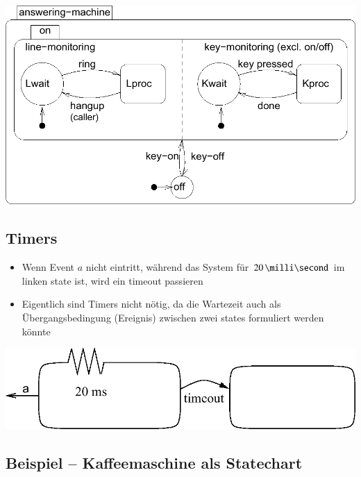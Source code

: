 \begin{center}
    \includegraphics[width=0.75\columnwidth]{images/statechart_concurrency.png}
\end{center}



\subsection{Timers}

\begin{itemize}
    \item Wenn Event $a$ nicht eintritt, während das System für $20 \, \milli \second$ im linken state ist, wird ein timeout passieren
    \item Eigentlich sind Timers nicht nötig, da die Wartezeit auch als Übergangsbedingung (Ereignis) zwischen zwei states formuliert werden könnte
\end{itemize}

\begin{center}
    \includegraphics[width=0.65\columnwidth]{images/statechart_timers.png}
\end{center}


\subsection{Beispiel -- Kaffeemaschine als Statechart}

